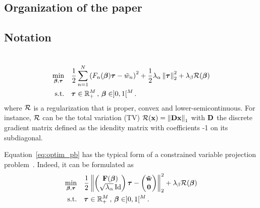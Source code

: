 \subsection{Organization of the paper}


\subsection{Notation}


\section{}


\section{}

\begin{equation}
  \label{eq:optim_pb}
  \begin{aligned}
    \min_{\bbeta,\btau} \quad &
    \frac{1}{2} \sum_{n=1}^{N} {\left(F_{n}(\bbeta)\btau - \tilde{w}_{n}\right)}^{2}
    +\frac{1}{2}\lambda_{\alpha}\norm{\btau}_{2}^{2} + \lambda_{\beta}\mR(\bbeta) \\
    \textrm{s.t.} \quad &
    \btau \in \RR^{M}_{+} \, , \, \bbeta \in ]0,1[^{M} \, .
  \end{aligned}
\end{equation}
where $\mathcal{R}$ is a regularization that is proper, convex and lower-semicontinuous.
For instance, $\mathcal{R}$ can be the total variation (TV) $\mathcal{R}(\mathbf{x})=\left\lVert\mathbf{D}\mathbf{x}\right\rVert_{1}$
with $\mathbf{D}$ the discrete gradient matrix defined as the idendity matrix with
coefficients -1 on its subdiagonal.

Equation~\eqref{eq:optim_pb} has the typical form of a constrained variable
projection problem~\cite{Golub_G_2003_j-inv-prob_separable_nlsvpma}.
Indeed, it can be formulated as
\begin{equation}
  \begin{aligned}
    \min_{\boldsymbol{\beta},\boldsymbol{\tau}} \quad &
    \frac{1}{2} \left\lVert\begin{pmatrix}\mathbf{F}(\boldsymbol{\beta}) \\ \sqrt{\lambda_{\alpha}}\operatorname{\mathrm{Id}}\end{pmatrix}\boldsymbol{\tau}
        - \begin{pmatrix}\boldsymbol{\tilde{\mathbf{w}}}\\ \mathbf{0} \end{pmatrix}\right\rVert_{2}^{2}
    + \lambda_{\beta}\mathcal{R}(\boldsymbol{\beta}) \\
    \textrm{s.t.} \quad &
    \boldsymbol{\tau} \in \mathbb{R}^{M}_{+} \, , \, \boldsymbol{\beta} \in ]0,1[^{M} \, .
  \end{aligned}
\end{equation}

